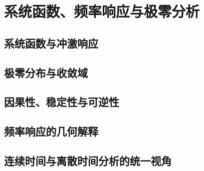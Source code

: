 \chapter{系统函数、频率响应与极零分析}
\label{chap:system-analysis}

\section{系统函数与冲激响应}
\section{极零分布与收敛域}
\section{因果性、稳定性与可逆性}
\section{频率响应的几何解释}
\section{连续时间与离散时间分析的统一视角}
